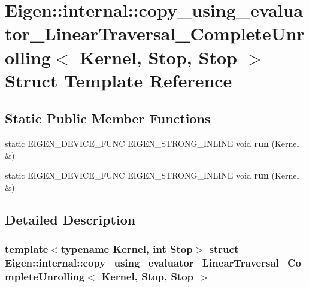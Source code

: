 \hypertarget{struct_eigen_1_1internal_1_1copy__using__evaluator___linear_traversal___complete_unrolling_3_01_c8b3cb7351f57cc3b8eaeb07b20f5de4}{}\section{Eigen\+:\+:internal\+:\+:copy\+\_\+using\+\_\+evaluator\+\_\+\+Linear\+Traversal\+\_\+\+Complete\+Unrolling$<$ Kernel, Stop, Stop $>$ Struct Template Reference}
\label{struct_eigen_1_1internal_1_1copy__using__evaluator___linear_traversal___complete_unrolling_3_01_c8b3cb7351f57cc3b8eaeb07b20f5de4}
\subsection*{Static Public Member Functions}
\begin{DoxyCompactItemize}
\item 
\mbox{\label{struct_eigen_1_1internal_1_1copy__using__evaluator___linear_traversal___complete_unrolling_3_01_c8b3cb7351f57cc3b8eaeb07b20f5de4_ac091bfbc88981b5c6f6435af523d42bf}} 
static E\+I\+G\+E\+N\+\_\+\+D\+E\+V\+I\+C\+E\+\_\+\+F\+U\+NC E\+I\+G\+E\+N\+\_\+\+S\+T\+R\+O\+N\+G\+\_\+\+I\+N\+L\+I\+NE void {\bfseries run} (Kernel \&)
\item 
\mbox{\label{struct_eigen_1_1internal_1_1copy__using__evaluator___linear_traversal___complete_unrolling_3_01_c8b3cb7351f57cc3b8eaeb07b20f5de4_ac091bfbc88981b5c6f6435af523d42bf}} 
static E\+I\+G\+E\+N\+\_\+\+D\+E\+V\+I\+C\+E\+\_\+\+F\+U\+NC E\+I\+G\+E\+N\+\_\+\+S\+T\+R\+O\+N\+G\+\_\+\+I\+N\+L\+I\+NE void {\bfseries run} (Kernel \&)
\end{DoxyCompactItemize}


\subsection{Detailed Description}
\subsubsection*{template$<$typename Kernel, int Stop$>$\newline
struct Eigen\+::internal\+::copy\+\_\+using\+\_\+evaluator\+\_\+\+Linear\+Traversal\+\_\+\+Complete\+Unrolling$<$ Kernel, Stop, Stop $>$}




